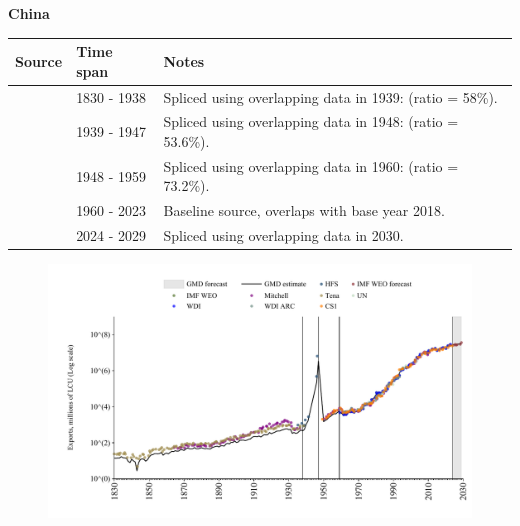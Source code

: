 \documentclass[12pt,a4paper,landscape]{article}
\begin{document}
\begin{adjustbox}{max totalsize={\paperwidth}{\paperheight},center}
\begin{minipage}[t][\textheight][t]{\textwidth}
\vspace*{0.5cm}
{}
\begin{center}
{\Large\bfseries China}
\end{center}
\vspace{0.5cm}
\begin{table}[H]
\centering
\small
\begin{tabular}{|l|l|l|}
\hline
\textbf{Source} & \textbf{Time span} & \textbf{Notes} \\
\hline
\rowcolor{white}\cite{Tena}& 1830 - 1938 &Spliced using overlapping data in 1939: (ratio = 58\%).\\
\rowcolor{lightgray}\cite{HFS}& 1939 - 1947 &Spliced using overlapping data in 1948: (ratio = 53.6\%).\\
\rowcolor{white}\cite{CS1_CHN}& 1948 - 1959 &Spliced using overlapping data in 1960: (ratio = 73.2\%).\\
\rowcolor{lightgray}\cite{WDI}& 1960 - 2023 &Baseline source, overlaps with base year 2018.\\
\rowcolor{white}\cite{IMF_WEO_forecast}& 2024 - 2029 &Spliced using overlapping data in 2030.\\
\hline
\end{tabular}
\end{table}
\begin{figure}[H]
\centering
\includegraphics[width=\textwidth,height=0.6\textheight,keepaspectratio]{graphs/CHN_exports.pdf}
\end{figure}
\end{minipage}
\end{adjustbox}
\end{document}
